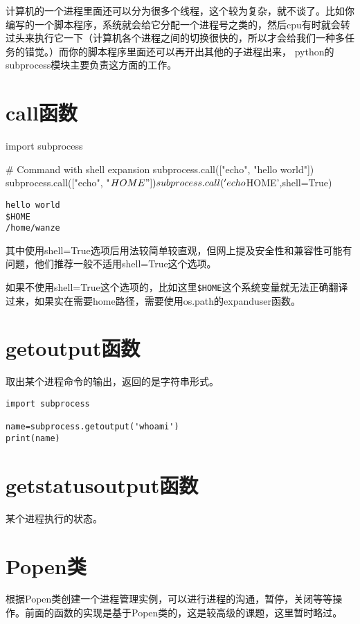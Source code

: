 \documentclass[12pt,oneside]{book}
\begin{document}
\begin{common-format}
计算机的一个进程里面还可以分为很多个线程，这个较为复杂，就不谈了。比如你编写的一个脚本程序，系统就会给它分配一个进程号之类的，然后cpu有时就会转过头来执行它一下（计算机各个进程之间的切换很快的，所以才会给我们一种多任务的错觉。）而你的脚本程序里面还可以再开出其他的子进程出来， python的subprocess模块主要负责这方面的工作。

\section{call函数}
\begin{tcbpython}[]
import subprocess

# Command with shell expansion
subprocess.call(["echo", "hello world"])
subprocess.call(["echo", "$HOME"])
subprocess.call('echo $HOME',shell=True)
\end{tcbpython}
\begin{Verbatim}
hello world
$HOME
/home/wanze
\end{Verbatim}

其中使用shell=True选项后用法较简单较直观，但网上提及安全性和兼容性可能有问题，他们推荐一般不适用shell=True这个选项。

如果不使用shell=True这个选项的，比如这里\verb+$HOME+这个系统变量就无法正确翻译过来，如果实在需要home路径，需要使用os.path的expanduser函数。



\section{getoutput函数}
取出某个进程命令的输出，返回的是字符串形式。
\begin{Verbatim}
import subprocess

name=subprocess.getoutput('whoami')
print(name)
\end{Verbatim}



\section{getstatusoutput函数}
某个进程执行的状态。



\section{Popen类}
根据Popen类创建一个进程管理实例，可以进行进程的沟通，暂停，关闭等等操作。前面的函数的实现是基于Popen类的，这是较高级的课题，这里暂时略过。




\end{common-format}
\end{document}

